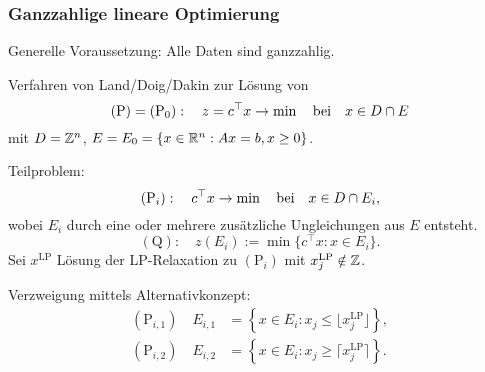 \subsubsection{Ganzzahlige lineare Optimierung}
Generelle Voraussetzung: Alle Daten sind ganzzahlig.

Verfahren von Land/Doig/Dakin zur Lösung von
\[ (\text{P}) = (\text{P}_0) : \quad
  z = c^\top x \to \min \quad \text{bei} \quad x \in D \cap E \]
mit $D = \mathbb{Z}^n$, $E = E_0 = \{ x \in \mathbb{R}^n : Ax = b, x \ge 0 \}$.

Teilproblem:
\[ (\text{P}_i) : \quad
  c^\top x \to \min \quad \text{bei} \quad x \in D \cap E_i, \]
wobei $E_i$ durch eine oder mehrere zusätzliche Ungleichungen aus $E$
entsteht.
\[ (\text{Q}): \quad
  z(E_i) := \min \{ c^\top x : x \in E_i \}. \]
Sei $x^{\text{LP}}$ Lösung der LP-Relaxation zu $(\text{P}_i)$ mit
$x_j^{\text{LP}} \notin \mathbb{Z}$.

Verzweigung mittels Alternativkonzept:
\begin{align*}
  (\text{P}_{i,1}) \quad E_{i,1}
  &= \left\{ x \in E_i : x_j \le \lfloor x_j^{\text{LP}} \rfloor \right\}, \\
  (\text{P}_{i,2}) \quad E_{i,2}
  &= \left\{ x \in E_i : x_j \ge \lceil x_j^{\text{LP}} \rceil \right\}. \\
\end{align*}

